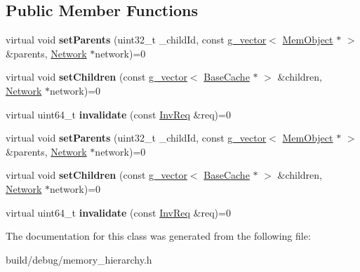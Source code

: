 \subsection*{Public Member Functions}
\begin{DoxyCompactItemize}
\item 
\hypertarget{classBaseCache_a869ed0b4434d75697a46e77279a89c37}{virtual void {\bfseries set\-Parents} (uint32\-\_\-t \-\_\-child\-Id, const \hyperlink{classg__vector}{g\-\_\-vector}$<$ \hyperlink{classMemObject}{Mem\-Object} $\ast$ $>$ \&parents, \hyperlink{classNetwork}{Network} $\ast$network)=0}\label{classBaseCache_a869ed0b4434d75697a46e77279a89c37}

\item 
\hypertarget{classBaseCache_a05e2d3cfe83d549065360b21bdaabea3}{virtual void {\bfseries set\-Children} (const \hyperlink{classg__vector}{g\-\_\-vector}$<$ \hyperlink{classBaseCache}{Base\-Cache} $\ast$ $>$ \&children, \hyperlink{classNetwork}{Network} $\ast$network)=0}\label{classBaseCache_a05e2d3cfe83d549065360b21bdaabea3}

\item 
\hypertarget{classBaseCache_adee591deb418ec0b938c20cfc40d335c}{virtual uint64\-\_\-t {\bfseries invalidate} (const \hyperlink{structInvReq}{Inv\-Req} \&req)=0}\label{classBaseCache_adee591deb418ec0b938c20cfc40d335c}

\item 
\hypertarget{classBaseCache_a869ed0b4434d75697a46e77279a89c37}{virtual void {\bfseries set\-Parents} (uint32\-\_\-t \-\_\-child\-Id, const \hyperlink{classg__vector}{g\-\_\-vector}$<$ \hyperlink{classMemObject}{Mem\-Object} $\ast$ $>$ \&parents, \hyperlink{classNetwork}{Network} $\ast$network)=0}\label{classBaseCache_a869ed0b4434d75697a46e77279a89c37}

\item 
\hypertarget{classBaseCache_a05e2d3cfe83d549065360b21bdaabea3}{virtual void {\bfseries set\-Children} (const \hyperlink{classg__vector}{g\-\_\-vector}$<$ \hyperlink{classBaseCache}{Base\-Cache} $\ast$ $>$ \&children, \hyperlink{classNetwork}{Network} $\ast$network)=0}\label{classBaseCache_a05e2d3cfe83d549065360b21bdaabea3}

\item 
\hypertarget{classBaseCache_adee591deb418ec0b938c20cfc40d335c}{virtual uint64\-\_\-t {\bfseries invalidate} (const \hyperlink{structInvReq}{Inv\-Req} \&req)=0}\label{classBaseCache_adee591deb418ec0b938c20cfc40d335c}

\end{DoxyCompactItemize}


The documentation for this class was generated from the following file\-:\begin{DoxyCompactItemize}
\item 
build/debug/memory\-\_\-hierarchy.\-h\end{DoxyCompactItemize}
